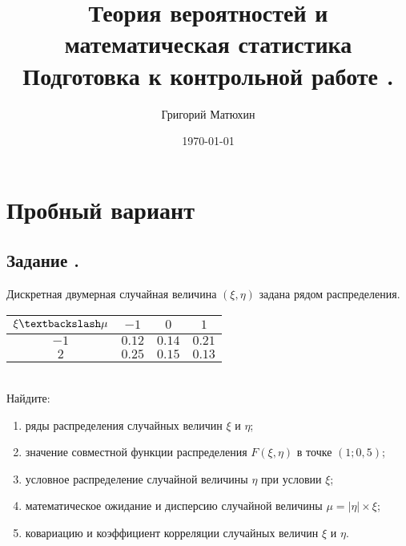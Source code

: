 \documentclass[12pt]{article}
\author{Григорий Матюхин}
\date{\today}
\title{
	Теория вероятностей и математическая статистика \\
	\large Подготовка к контрольной работе \textnumero3.
}
\begin{document}
\maketitle
\newpage
\tableofcontents
\newpage

\section{Пробный вариант}
\subsection{Задание .}
Дискретная двумерная случайная величина $(\xi, \eta)$ задана рядом распределения. \\
\begin{tabular}{|c|c|c|c|}
	\hline
	$\xi \textbackslash \mu$ & $-1$   & $0$    & $1$    \\
	\hline
	$-1$                     & $0.12$ & $0.14$ & $0.21$ \\
	\hline
	$2$                      & $0.25$ & $0.15$ & $0.13$ \\
	\hline
\end{tabular} \\
Найдите:
\begin{enumerate}
	\item ряды распределения случайных величин $\xi$ и $\eta$;
	\item значение совместной функции распределения $F(\xi, \eta)$ в точке $(1;0,5)$;
	\item условное распределение случайной величины $\eta$ при условии $\xi$;
	\item математическое ожидание и дисперсию случайной величины $\mu = |\eta| \times \xi$;
	\item ковариацию и коэффициент корреляции случайных величин $\xi$ и $\eta$.
\end{enumerate}
\end{document}
